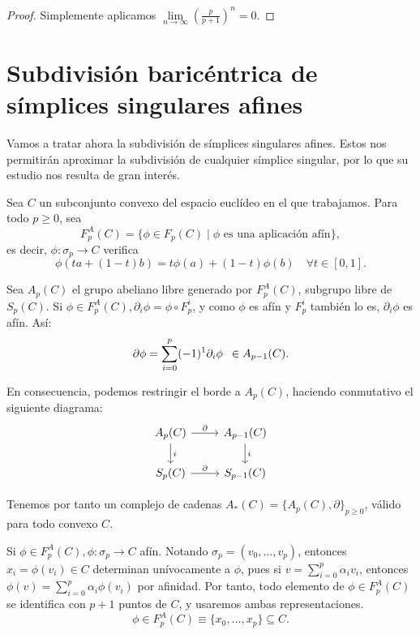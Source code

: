 \begin{proof}
  Simplemente aplicamos $\lim\limits_{n \to \infty}(\frac{p}{p+1})^n = 0$.
\end{proof}

\section{Subdivisión baricéntrica de símplices singulares afines}

Vamos a tratar ahora la subdivisión de símplices singulares afines. Estos nos permitirán aproximar la
subdivisión de cualquier símplice singular, por lo que su estudio nos resulta de gran interés.

Sea $C$ un subconjunto convexo del espacio euclídeo en el que trabajamos. Para todo $p \geq 0$, sea
\[F_p^A(C) = \{ \phi \in F_p(C) \mid \phi \text{ es una aplicación afín}\}, \]
es decir, $\phi \colon \sigma_p \to C $ verifica \[\phi(ta + (1-t)b) = t\phi(a) + (1-t)\phi(b) \hspace{1em} \forall t \in [0,1].\]

Sea $A_p(C)$ el grupo abeliano libre generado por $F_p^A(C)$, subgrupo libre de $S_p(C)$. Si $\phi \in F_p^A(C), \partial_i \phi = \phi \circ F_p^i$,
y como $\phi$ es afín y $F_p^i$ también lo es, $\partial_i \phi$ es afín. Así:
\[\partial \phi = \sum\limits_{i = 0}^p (-1)^1 \partial_i \phi \hspace{0.5em} \in A_{p-1}(C).\]

En consecuencia, podemos restringir el borde a $A_p(C)$, haciendo conmutativo el siguiente diagrama:
\[ \begin{tikzcd}
      A_p(C) \arrow{r}{\partial} \arrow{d}{i} & A_{p-1}(C) \arrow{d}{i} \\
      S_p(C) \arrow{r}{\partial} & S_{p-1}(C)
\end{tikzcd} \]

Tenemos por tanto un complejo de cadenas $A_*(C) = \{A_p(C), \partial\}_{p \geq 0}$, válido para todo convexo $C$.

Si $\phi \in F_p^A(C), \phi \colon \sigma_p \to C$ afín. Notando $\sigma_p = (v_0, \dots, v_p)$, entonces
${x_i = \phi(v_i) \in C}$ determinan unívocamente a $\phi$, pues si $v = \sum\limits_{i = 0}^p \alpha_i v_i$, entonces
$\phi(v) = \sum\limits_{i = 0}^p \alpha_i \phi(v_i)$ por afinidad. Por tanto, todo elemento de $\phi \in F_p^A(C)$ se
identifica con $p+1$ puntos de $C$, y usaremos ambas representaciones.
\[\phi \in F_p^A(C) \equiv \{x_0, \dots, x_p\} \subseteq C.\]

